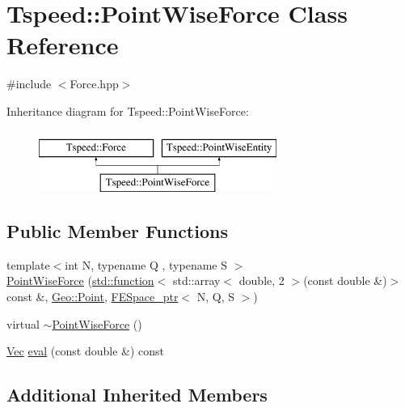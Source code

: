\hypertarget{classTspeed_1_1PointWiseForce}{\section{Tspeed\-:\-:Point\-Wise\-Force Class Reference}
\label{classTspeed_1_1PointWiseForce}
}


{\ttfamily \#include $<$Force.\-hpp$>$}

Inheritance diagram for Tspeed\-:\-:Point\-Wise\-Force\-:\begin{figure}[H]
\begin{center}
\leavevmode
\includegraphics[height=2.000000cm]{classTspeed_1_1PointWiseForce}
\end{center}
\end{figure}
\subsection*{Public Member Functions}
\begin{DoxyCompactItemize}
\item 
{\footnotesize template$<$int N, typename Q , typename S $>$ }\\\hyperlink{classTspeed_1_1PointWiseForce_ad30aab53a735b22fac2b5cfeaa4d0c28}{Point\-Wise\-Force} (\hyperlink{vtk__vector__out_8m_a6235d6cebbf2f77ca6dbae2811d86530}{std\-::function}$<$ std\-::array$<$ double, 2 $>$(const double \&)$>$ const \&, \hyperlink{classTspeed_1_1Geo_1_1Point}{Geo\-::\-Point}, \hyperlink{namespaceTspeed_a05fcb57094666c8f5ab1e90d1a6fecf8}{F\-E\-Space\-\_\-ptr}$<$ N, Q, S $>$)
\item 
virtual \hyperlink{classTspeed_1_1PointWiseForce_a34ad80033ed1e9d5ba31feffae4ab7c9}{$\sim$\-Point\-Wise\-Force} ()
\item 
\hyperlink{classTspeed_1_1Force_ab33d4f6bed9bf9a136afd1ac5a918c93}{Vec} \hyperlink{classTspeed_1_1PointWiseForce_ae52b1302d87e4535620e205fe030d542}{eval} (const double \&) const 
\end{DoxyCompactItemize}
\subsection*{Additional Inherited Members}


